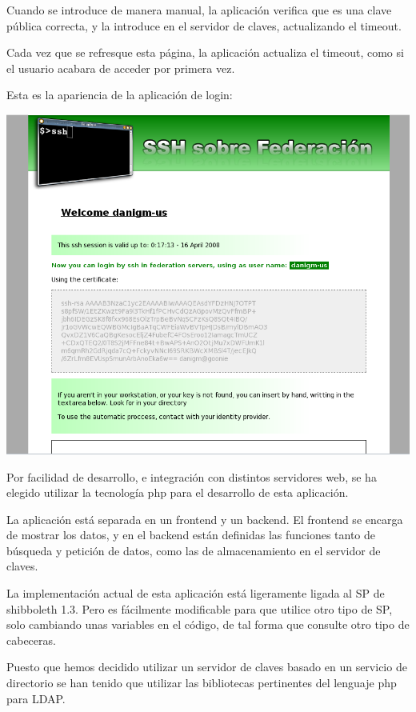     Cuando se introduce de manera manual, la aplicación verifica que es una
    clave pública correcta, y la introduce en el servidor de claves,
    actualizando el timeout.

    Cada vez que se refresque esta página, la aplicación actualiza el
    timeout, como si el usuario acabara de acceder por primera vez.

    Esta es la apariencia de la aplicación de login:
     
    \begin{center}
        \includegraphics[width=\textwidth]{img/sshApp.png}
    \end{center}
     
    Por facilidad de desarrollo, e integración con distintos servidores
    web, se ha elegido utilizar la tecnología php para el desarrollo de
    esta aplicación.

    La aplicación está separada en un frontend y un backend. El frontend se
    encarga de mostrar los datos, y en el backend están definidas las
    funciones tanto de búsqueda y petición de datos, como las de
    almacenamiento en el servidor de claves.

    La implementación actual de esta aplicación está ligeramente ligada al
    SP de shibboleth 1.3. Pero es fácilmente modificable para que utilice
    otro tipo de SP, solo cambiando unas variables en el código, de tal
    forma que consulte otro tipo de cabeceras.

    Puesto que hemos decidido utilizar un servidor de claves basado en un
    servicio de directorio se han tenido que utilizar las bibliotecas
    pertinentes del lenguaje php para LDAP.

